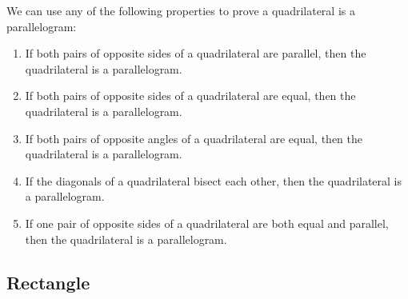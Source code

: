 \par    
We can use any of the following properties to prove a quadrilateral is a parallelogram:
\begin{enumerate}[label=\textbf{\arabic*}.]
 \item If both pairs of opposite sides of a quadrilateral are parallel, then the quadrilateral is a parallelogram.
 \item If both pairs of opposite sides of a quadrilateral are equal, then the quadrilateral is a parallelogram.
 \item If both pairs of opposite angles of a quadrilateral are equal, then the quadrilateral is a parallelogram.
 \item If the diagonals of a quadrilateral bisect each other, then the quadrilateral is a parallelogram.
 \item If one pair of opposite sides of a quadrilateral are both equal and parallel, then the quadrilateral is a parallelogram.
\end{enumerate}

\subsection{Rectangle}

